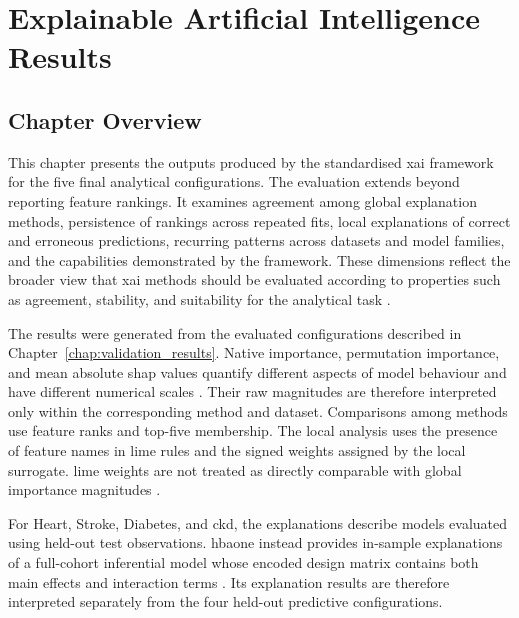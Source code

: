 \chapter{Explainable Artificial Intelligence Results}
\label{chap:xai_results}

\section{Chapter Overview}

This chapter presents the outputs produced by the standardised \gls{xai} framework for the five final analytical configurations. The evaluation extends beyond reporting feature rankings. It examines agreement among global explanation methods, persistence of rankings across repeated fits, local explanations of correct and erroneous predictions, recurring patterns across datasets and model families, and the capabilities demonstrated by the framework. These dimensions reflect the broader view that \gls{xai} methods should be evaluated according to properties such as agreement, stability, and suitability for the analytical task \citep{mohseni_multidisciplinary_2021, vilone_classification_2021, lofstrom_meta_2022, canha_functionally-grounded_2025}.

The results were generated from the evaluated configurations described in Chapter~\ref{chap:validation_results}. Native importance, permutation importance, and mean absolute \gls{shap} values quantify different aspects of model behaviour and have different numerical scales \citep{fisher_models_2019, NIPS2017_8a20a862, linardatos_explainable_2020}. Their raw magnitudes are therefore interpreted only within the corresponding method and dataset. Comparisons among methods use feature ranks and top-five membership. The local analysis uses the presence of feature names in \gls{lime} rules and the signed weights assigned by the local surrogate. \gls{lime} weights are not treated as directly comparable with global importance magnitudes \citep{ribeiro_why_2016, vilone_classification_2021}.

For Heart, Stroke, Diabetes, and \gls{ckd}, the explanations describe models evaluated using held-out test observations. \gls{hbaone} instead provides in-sample explanations of a full-cohort inferential model whose encoded design matrix contains both main effects and interaction terms \citep{strack_impact_2014}. Its explanation results are therefore interpreted separately from the four held-out predictive configurations.

